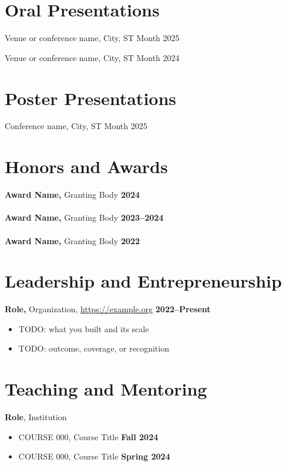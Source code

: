 \begin{resume}
\section{Oral Presentations}
\secstartswithlist{}%
\begin{etaremune}
\item
  Venue or conference name, City, ST
  \hfill{}
  Month 2025
\item
  Venue or conference name, City, ST
  \hfill{}
  Month 2024
\end{etaremune}

\section{Poster Presentations}
\secstartswithlist{}%
\begin{etaremune}
\item
  Conference name, City, ST
  \hfill{}
  Month 2025
\end{etaremune}

\section{Honors and Awards}
{\bf Award Name,} Granting Body \hfill {\bf 2024}\\
\\
{\bf Award Name,} Granting Body \hfill {\bf 2023--2024}\\
\\
{\bf Award Name,} Granting Body \hfill {\bf 2022}\\

\vspace{-1em}

\section{Leadership and Entrepreneurship}
{\bf Role,} Organization, \url{https://example.org} \hfill {\bf 2022--Present}
\begin{itemize}
\item[ ] TODO: what you built and its scale
\item[ ] TODO: outcome, coverage, or recognition
\end{itemize}

\section{Teaching and Mentoring}
{\bf Role}, Institution
\vspace*{.05in}
\begin{itemize}
\item[ ] COURSE 000, Course Title \hfill {\bf Fall 2024}
\item[ ] COURSE 000, Course Title \hfill {\bf Spring 2024}
\end{itemize}


\end{resume}
